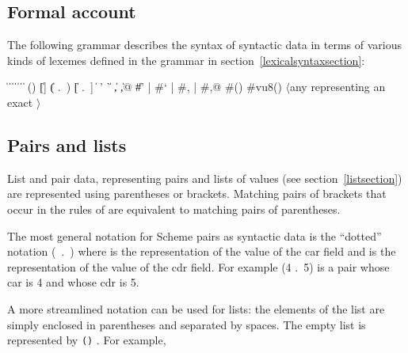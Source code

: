 \subsection{Formal account}
\label{datumsyntax}

The following grammar describes the syntax of syntactic data in terms
of various kinds of lexemes defined in the grammar in
section~\ref{lexicalsyntaxsection}:

\begin{grammar}%
 \: 
\>  \| 
 \:  \| 
\>  \|  \|  \|  
 \: 
 \:  \|  \| 
 \: () \| []
\>    \| ( .\ ) \| [ .\ ]
\>    \| 
 \:  
 \: ' \| ` \| , \| ,@
\>    \| \#' | \#` | \#, | \#,@
 \: \#()
 \: \#vu8()
 \: $\langle${\rm any  representing an exact}
 \>\>\quad{}$\rangle$%
\end{grammar}

\subsection{Pairs and lists}
\label{pairlistsyntax}

List and pair data, representing pairs and lists of values
(see section~\ref{listsection}) are represented using parentheses or brackets.
Matching pairs of brackets that occur in the rules of  are
equivalent to matching pairs of parentheses.

The most general notation for Scheme pairs as syntactic data is
the ``dotted'' notation \hbox{\cf ( .\ )} where
 is the representation of the value of the car field and
 is the representation of the value of the
cdr field.  For example {\cf (4 .\ 5)} is a pair whose car is 4 and whose
cdr is 5.

A more streamlined notation can be used for lists: the elements of the
list are simply enclosed in parentheses and separated by spaces.  The
empty list is represented by {\tt()} .  For example,

